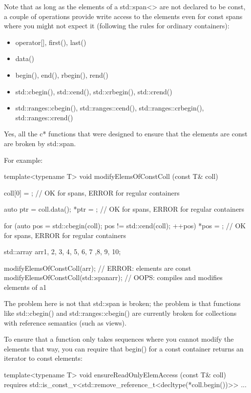 Note that as long as the elements of a std::span<> are not declared to be const, a couple of operations provide write access to the elements even for const spans where you might not expect it (following the rules for ordinary containers):

\begin{itemize}
\item
operator[], first(), last()

\item
data()

\item
begin(), end(), rbegin(), rend()

\item
std::cbegin(), std::cend(), std::crbegin(), std::crend()

\item
std::ranges::cbegin(), std::ranges::cend(), std::ranges::crbegin(), std::ranges::crend()
\end{itemize}

Yes, all the c* functions that were designed to ensure that the elements are const are broken by std::span.

For example:

\begin{cpp}
template<typename T>
void modifyElemsOfConstColl (const T& coll)
{
	coll[0] = {}; // OK for spans, ERROR for regular containers
	
	auto ptr = coll.data();
	*ptr = {}; // OK for spans, ERROR for regular containers
	
	for (auto pos = std::cbegin(coll); pos != std::cend(coll); ++pos) {
		*pos = {}; // OK for spans, ERROR for regular containers
	}
}

std::array arr{1, 2, 3, 4, 5, 6, 7 ,8, 9, 10};

modifyElemsOfConstColl(arr); // ERROR: elements are const
modifyElemsOfConstColl(std::span{arr}); // OOPS: compiles and modifies elements of a1
\end{cpp}

The problem here is not that std::span is broken; the problem is that functions like std::cbegin() and std::ranges::cbegin() are currently broken for collections with reference semantics (such as views).

To ensure that a function only takes sequences where you cannot modify the elements that way, you can require that begin() for a const container returns an iterator to const elements:

\begin{cpp}
template<typename T>
void ensureReadOnlyElemAccess (const T& coll)
requires std::is_const_v<std::remove_reference_t<decltype(*coll.begin())>>
{
	...
}
\end{cpp}

